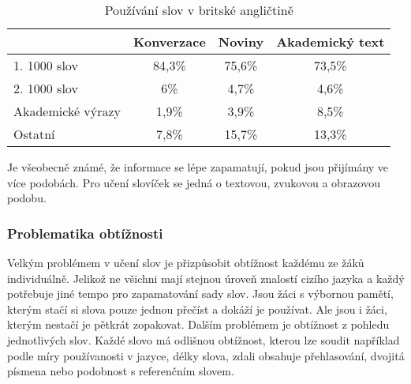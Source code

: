 \documentclass[a4paper,11pt,titlepage,fleqn]{article}
\begin{document}
        \begin{table}[ht!]
            \centering
            \begin{tabular}{|l|c|c|c|}
            \hline
            & \multicolumn{1}{l|}{Konverzace} & \multicolumn{1}{l|}{Noviny} & \multicolumn{1}{l|}{Akademický text} \\ \hline
            1. 1000 slov & 84,3\% & 75,6\% & 73,5\% \\ \hline
            2. 1000 slov & 6\% & 4,7\% & 4,6\% \\ \hline
            Akademické výrazy& 1,9\% & 3,9\% & 8,5\% \\ \hline
            Ostatní & 7,8\% & 15,7\% & 13,3\% \\ \hline
            \end{tabular}
            \caption{Používání slov v britské angličtině}
            \label{tab:english-vocab-usage}
        \end{table}

        Je všeobecně známé, že informace se lépe zapamatují, pokud jsou přijímány ve více podobách. Pro učení slovíček se jedná o textovou, zvukovou a obrazovou podobu. 


        \subsubsection{Problematika obtížnosti}
            Velkým problémem v učení slov je přizpůsobit obtížnost každému ze žáků individuálně. Jelikož ne všichni mají stejnou úroveň znalostí cizího jazyka a každý potřebuje jiné tempo pro zapamatování sady slov. Jsou žáci s výbornou pamětí, kterým stačí si slova pouze jednou přečíst a dokáží je používat. Ale jsou i žáci, kterým nestačí je pětkrát zopakovat. Dalším problémem je obtížnost z pohledu jednotlivých slov. Každé slovo má odlišnou obtížnost, kterou lze soudit například podle míry používanosti v jazyce, délky slova, zdali obsahuje přehlasování, dvojitá písmena nebo podobnost s referenčním slovem.
\end{document}
